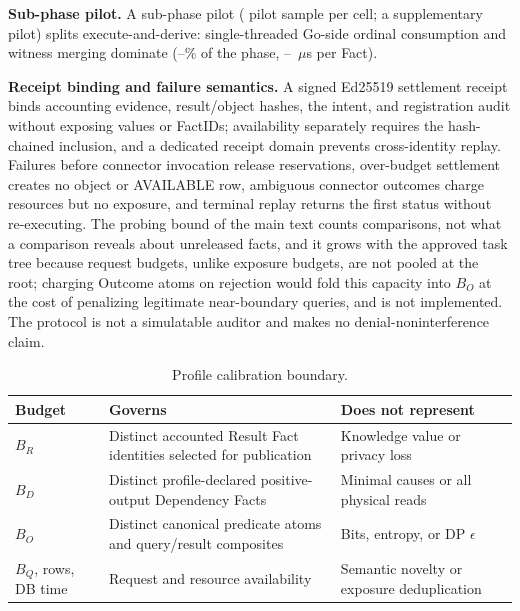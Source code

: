 \documentclass[journal,onecolumn]{IEEEtran}
\newcommand{\code}[1]{\texttt{\detokenize{#1}}}
\begin{document}
\textbf{Sub-phase pilot.} A sub-phase pilot
(\FinalVFiveSubphaseSamplesSTwoSFTen{} pilot sample per cell; a
supplementary pilot) splits execute-and-derive: single-threaded Go-side
ordinal consumption and witness merging dominate
(\FinalVFiveSubphaseGoSidePctSOneSFOne{}--\FinalVFiveSubphaseGoSidePctSSixHundredKByteSixteen\%
of the phase,
\FinalVFiveSubphaseMicrosPerFactSTwoSFTen{}--\FinalVFiveSubphaseMicrosPerFactSSixHundredKByteSixteen{}~$\mu$s
per Fact).

\textbf{Receipt binding and failure semantics.}
A signed Ed25519 settlement receipt binds accounting evidence, result/object
hashes, the \code{PENDING} intent, and registration audit without exposing
values or FactIDs; availability separately requires the hash-chained
\code{QUERY_RESULT_CONSUMED} inclusion, and a dedicated receipt domain
prevents cross-identity replay. Failures before connector invocation release
reservations, over-budget settlement creates no object or AVAILABLE row,
ambiguous connector outcomes charge resources but no exposure, and terminal
replay returns the first status without re-executing. The probing bound of
the main text counts comparisons, not what a comparison reveals about
unreleased facts, and it grows with the approved task tree because request
budgets, unlike exposure budgets, are not pooled at the root; charging
Outcome atoms on rejection would fold this capacity into $B_O$ at the cost
of penalizing legitimate near-boundary queries, and is not implemented. The
protocol is not a simulatable auditor and makes no denial-noninterference
claim.

\begin{table}[h]
\centering
\caption{Profile calibration boundary.}
\label{tab:profile-calibration}
\scriptsize
\setlength{\tabcolsep}{2.5pt}
\begin{tabular}{L{0.16\columnwidth}L{0.42\columnwidth}L{0.30\columnwidth}}
\toprule
Budget & Governs & Does not represent \\
\midrule
$B_R$ & Distinct accounted Result Fact identities selected for publication & Knowledge value or privacy loss \\
$B_D$ & Distinct profile-declared positive-output Dependency Facts & Minimal causes or all physical reads \\
$B_O$ & Distinct canonical predicate atoms and query/result composites & Bits, entropy, or DP $\epsilon$ \\
$B_Q$, rows, DB time & Request and resource availability & Semantic novelty or exposure deduplication \\
\bottomrule
\end{tabular}
\end{table}
\end{document}
